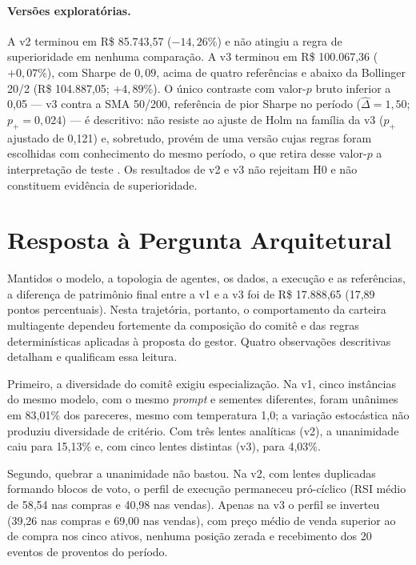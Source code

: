 \documentclass{eic-bcc-tcc}
\begin{document}
\paragraph{Versões exploratórias.} A v2 terminou em R\$ 85.743,57 ($-14{,}26\%$) e não atingiu a regra de superioridade em nenhuma comparação. A v3 terminou em R\$ 100.067,36 ($+0{,}07\%$), com Sharpe de $0{,}09$, acima de quatro referências e abaixo da Bollinger 20/2 (R\$ 104.887,05; $+4{,}89\%$). O único contraste com valor-$p$ bruto inferior a 0,05 --- v3 contra a SMA 50/200, referência de pior Sharpe no período ($\hat{\Delta} = 1{,}50$; $p_{+} = 0{,}024$) --- é descritivo: não resiste ao ajuste de Holm na família da v3 ($p_{+}$ ajustado de 0,121) e, sobretudo, provém de uma versão cujas regras foram escolhidas com conhecimento do mesmo período, o que retira desse valor-$p$ a interpretação de teste \citep{White2000, Bailey2017}. Os resultados de v2 e v3 não rejeitam H0 e não constituem evidência de superioridade.

\section{Resposta à Pergunta Arquitetural}

Mantidos o modelo, a topologia de agentes, os dados, a execução e as referências, a diferença de patrimônio final entre a v1 e a v3 foi de R\$ 17.888,65 (17,89 pontos percentuais). Nesta trajetória, portanto, o comportamento da carteira multiagente dependeu fortemente da composição do comitê e das regras determinísticas aplicadas à proposta do gestor. Quatro observações descritivas detalham e qualificam essa leitura.

Primeiro, a diversidade do comitê exigiu especialização. Na v1, cinco instâncias do mesmo modelo, com o mesmo \textit{prompt} e sementes diferentes, foram unânimes em 83,01\% dos pareceres, mesmo com temperatura 1,0; a variação estocástica não produziu diversidade de critério. Com três lentes analíticas (v2), a unanimidade caiu para 15,13\% e, com cinco lentes distintas (v3), para 4,03\%.

Segundo, quebrar a unanimidade não bastou. Na v2, com lentes duplicadas formando blocos de voto, o perfil de execução permaneceu pró-cíclico (RSI médio de 58,54 nas compras e 40,98 nas vendas). Apenas na v3 o perfil se inverteu (39,26 nas compras e 69,00 nas vendas), com preço médio de venda superior ao de compra nos cinco ativos, nenhuma posição zerada e recebimento dos 20 eventos de proventos do período.
\end{document}
